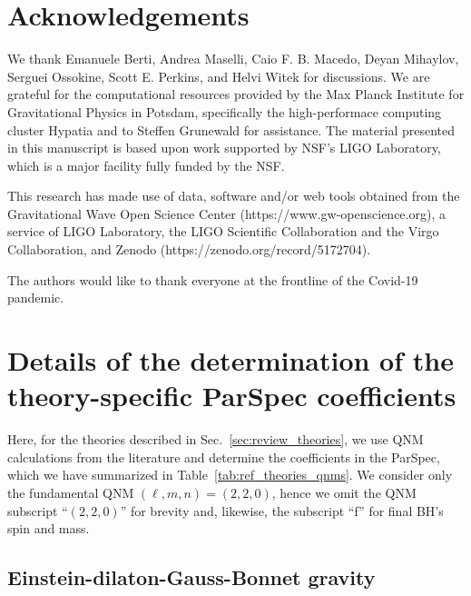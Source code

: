 \documentclass[twocolumn,
               prd,
               aps,
               superscriptaddress,
               tightenlines,
               nofootinbib,
               eqsecnum,
               amsfonts,
               amsmath,
               longbibliography]{revtex4-1}
\begin{document}

\section*{Acknowledgements}
\label{sec:acknowledgements}
%
We thank Emanuele Berti, Andrea Maselli, Caio F. B. Macedo, Deyan Mihaylov,
Serguei Ossokine, Scott E. Perkins, and Helvi Witek for discussions.
%
We are grateful for the computational resources provided by the Max Planck
Institute for Gravitational Physics in Potsdam, specifically the
high-performace computing cluster Hypatia and to Steffen Grunewald for
assistance.
%
The material presented in this manuscript is based upon work supported by NSF’s LIGO Laboratory,
which is a major facility fully funded by the NSF.

This research has made use of data, software and/or web tools obtained from the Gravitational Wave Open
Science Center (https://www.gw-openscience.org), a service of LIGO Laboratory, the LIGO Scientific Collaboration
and the Virgo Collaboration, and Zenodo (https://zenodo.org/record/5172704).

The authors would like to thank everyone at the frontline of the Covid-19
pandemic.

\appendix

\section{Details of the determination of the theory-specific ParSpec coefficients}
\label{app:map_details}

Here, for the theories described in Sec.~\ref{sec:review_theories}, we
use QNM calculations from the literature and determine
the coefficients in the ParSpec, which we have summarized
in Table~\ref{tab:ref_theories_qnms}.
%
We consider only the fundamental QNM $(\ell, m, n) = (2, 2, 0)$,
hence we omit the QNM subscript ``$(2,2,0)$'' for brevity and, likewise,
the subscript ``f'' for final BH's spin and mass.

\subsection{Einstein-dilaton-Gauss-Bonnet gravity}
\label{app:map_edgb}
\end{document}
